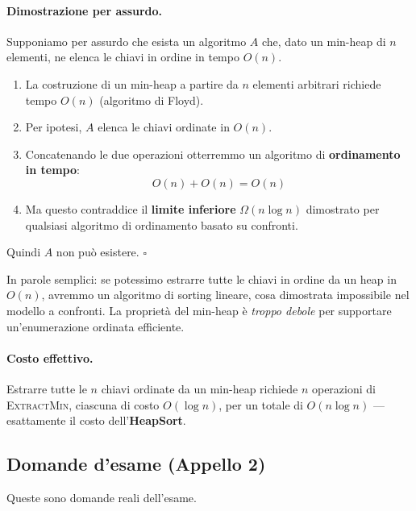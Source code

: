 	\paragraph{Dimostrazione per assurdo.}
	Supponiamo per assurdo che esista un algoritmo $A$ che, dato un min-heap di $n$ elementi, ne elenca le chiavi in ordine in tempo $O(n)$.
	
	\begin{enumerate}
		\item La costruzione di un min-heap a partire da $n$ elementi arbitrari richiede tempo $O(n)$ (algoritmo di Floyd).
		\item Per ipotesi, $A$ elenca le chiavi ordinate in $O(n)$.
		\item Concatenando le due operazioni otterremmo un algoritmo di \textbf{ordinamento in tempo}:
		\[
		O(n) + O(n) = O(n)
		\]
		\item Ma questo contraddice il \textbf{limite inferiore} $\Omega(n \log n)$ dimostrato per qualsiasi algoritmo di ordinamento basato su confronti.
	\end{enumerate}
	
	Quindi $A$ non può esistere. $\square$
	
	\begin{softnote}
		In parole semplici: se potessimo estrarre tutte le chiavi in ordine da un heap in $O(n)$, avremmo un algoritmo di sorting lineare, cosa dimostrata impossibile nel modello a confronti. La proprietà del min-heap è \emph{troppo debole} per supportare un'enumerazione ordinata efficiente.
	\end{softnote}
	
	\paragraph{Costo effettivo.}
	Estrarre tutte le $n$ chiavi ordinate da un min-heap richiede $n$ operazioni di \textsc{ExtractMin}, ciascuna di costo $O(\log n)$, per un totale di $O(n \log n)$ — esattamente il costo dell'\textbf{HeapSort}.

\subsection{Domande d'esame (Appello 2)}

\begin{hardnote}
	Queste sono domande reali dell'esame.\footnotemark
\end{hardnote}


